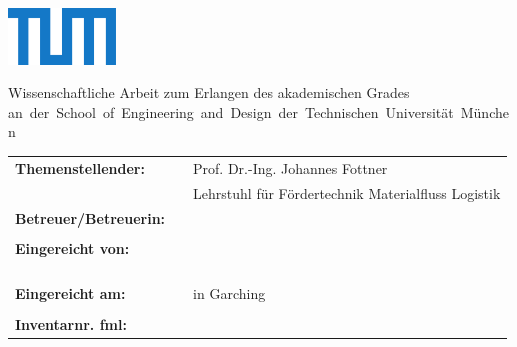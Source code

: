 

\makeatletter
\newcommand{\Titelblatt}{%
	\begin{titlepage}
	\raggedbottom
	\begin{flushright}	
	\includegraphics[height=15mm]{./resources/TUM_Logo_blau.pdf} \\ [1ex]
	\end{flushright}

		\begin{Huge}		
			\@title \par 
		\end{Huge}
			
		\begin{LARGE}
			\@subtitle \par
		\end{LARGE}

		\vspace{100 pt}
		
		\begin{large}
			Wissenschaftliche Arbeit zum Erlangen des akademischen Grades \newline
			\arbeitstyp  \newline
			\mbox{an der School of Engineering and Design der Technischen Universität München}
		\end{large}
	
		\vspace{20 pt}

		\begin{table}[h]
			\hskip-0.2cm
			\begin{tabular}{lll}
				\textbf{Themenstellender:} &  & Prof. Dr.-Ing. Johannes Fottner \\
				&  & Lehrstuhl für Fördertechnik Materialfluss Logistik \\
				\textbf{Betreuer/Betreuerin:}&  & \Betreuer \\
				&  &  \\
				\textbf{Eingereicht von:} &  & \hl{\@author} \\
				&  & \adresseI \\
				&  & \adresseII \\
				&  & \telnr \\
				&  & \\
				\textbf{Eingereicht am:} &  & \abgabetermin{} in Garching \\
				& & \\
				\textbf{Inventarnr. fml:}& & \hl{\Arbeitsnummer} \\
			\end{tabular}
		\end{table}

	 
	\end{titlepage}

}
\makeatother

\Titelblatt

	

